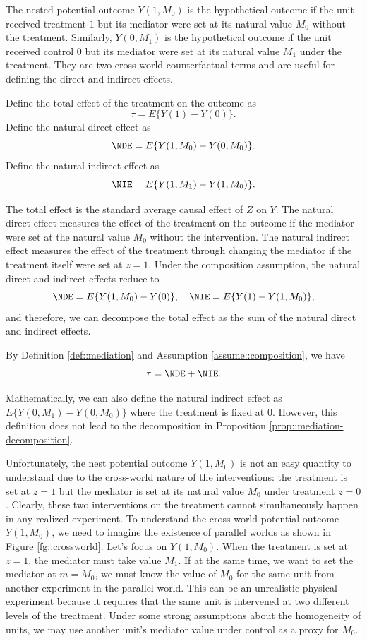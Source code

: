 The nested potential outcome $Y(1,M_0)$ is the hypothetical outcome if the unit received treatment $1$ but its mediator were set at its natural value $M_0$ without the treatment. Similarly, $Y(0,M_1)$ is the hypothetical outcome if the unit received control $0$ but its mediator were set at its natural value $M_1$ under the treatment. They are two cross-world counterfactual terms and are useful for defining the direct and indirect effects. 


\begin{definition}
\label{def::mediation}
Define the total effect of the treatment on the outcome as
$$
\tau = E\{ Y(1)  - Y(0) \}.
$$
Define the natural direct effect as
$$
\NDE = E\{  Y(1,M_0) - Y(0, M_0)  \}. 
$$
Define the natural indirect effect as 
$$
\NIE = E\{  Y(1, M_1) - Y(1, M_0) \} .
$$
\end{definition}


The total effect is the standard average causal effect of $Z$ on $Y$. The natural direct effect measures the effect of the treatment on the outcome if the mediator were set at the natural value $M_0$ without the intervention. The natural indirect effect measures the effect of the treatment through changing the mediator if the treatment itself were set at $z=1$.  Under the composition assumption, the natural direct and indirect effects reduce to 
$$
\NDE = E\{  Y(1,M_0) - Y(0)  \} ,\quad
\NIE = E\{  Y(1) - Y(1, M_0) \},
$$
and therefore, we can decompose the total effect as the sum of the natural direct and indirect effects.


\begin{proposition}
\label{prop::mediation-decomposition}
By Definition \ref{def::mediation} and Assumption \ref{assume::composition}, we have 
$$
\tau = \NDE + \NIE .
$$
\end{proposition}

Mathematically, we can also define the natural indirect effect as $ E\{  Y(0, M_1) - Y(0, M_0) \}$ where the treatment is fixed at $0$. However, this definition does not lead to the decomposition in Proposition \ref{prop::mediation-decomposition}. 

Unfortunately, the nest potential outcome $Y(1,M_0)$ is not an easy quantity to understand due to the cross-world nature of the interventions: the treatment is set at $z=1$ but the mediator is set at its natural value $M_0$ under treatment $z=0$. Clearly, these two interventions on the treatment cannot simultaneously happen in any realized experiment. To understand the cross-world potential outcome $Y(1,M_0)$, we need to imagine the existence of parallel worlds as shown in Figure \ref{fg::crossworld}. Let's focus on $Y(1,M_0)$. When the treatment is set at $z=1$, the mediator must take value $M_1$. If at the same time, we want to set the mediator at $m=M_0$, we must know the value of $M_0$ for the same unit from another experiment in the parallel world. This can be an unrealistic physical experiment because it requires that the same unit is intervened at two different levels of the treatment. Under some strong assumptions about the homogeneity of units, we may use another unit's mediator value under control as a proxy for $M_0$. 



